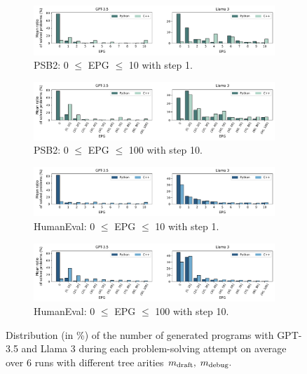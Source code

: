 \begin{figure}
\begin{subfigure}{.8\columnwidth}
\centering
\includegraphics[width=\linewidth, trim={0mm 3mm 0mm 0mm}, clip]{images/epg_distribution_step_1_psb2_6runs_barplot_v5.pdf}
  \caption{PSB2: 0 $\leq$ EPG $\leq$ 10 with step 1.}
  \label{fig:psb2-epg-distrib-step-1}
\end{subfigure}
% 
% 
\begin{subfigure}{.8\columnwidth}
\centering
\includegraphics[width=\linewidth, trim={0mm 3mm 0mm 0mm}, clip]{images/epg_distribution_step_10_psb2_6runs_barplot_v5.pdf}
  \caption{PSB2: 0 $\leq$ EPG $\leq$ 100 with step 10.}
  \label{fig:psb2-epg-distrib-step-10}
\end{subfigure}
% 
\begin{subfigure}{.8\columnwidth}
\centering
\includegraphics[width=\linewidth, trim={0mm 3mm 0mm 0mm}, clip]{images/epg_distribution_step_1_humaneval_6runs_barplot_v5.pdf}
  \caption{HumanEval: 0 $\leq$ EPG $\leq$ 10 with step 1.}
  \label{fig:humaneval-epg-distrib-step-1}
\end{subfigure}
% 
\begin{subfigure}{.8\columnwidth}
\centering
\includegraphics[width=\linewidth, trim={0mm 3mm 0mm 0mm}, clip]{images/epg_distribution_step_10_humaneval_6runs_barplot_v5.pdf}
  \caption{HumanEval: 0 $\leq$ EPG $\leq$ 100 with step 10.}
  \label{fig:humaneval-epg-distrib-step-10}
\end{subfigure}
\caption{Distribution (in \%) of the number of generated programs with GPT-3.5 and Llama 3 during each problem-solving attempt on average over 6 runs with different tree arities $m_\text{draft}, \; m_\text{debug}.$}
\label{fig:epg-distribution}
\end{figure}



